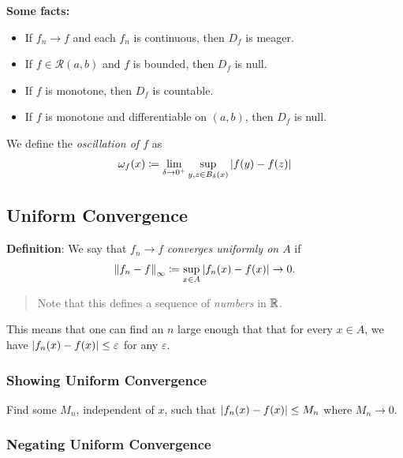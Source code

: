\textbf{Some facts:}

\begin{itemize}
\item
  If \(f_n \to f\) and each \(f_n\) is continuous, then \(D_f\) is
  meager.
\item
  If \(f \in \mathcal{R}(a, b)\) and \(f\) is bounded, then \(D_f\) is
  null.
\item
  If \(f\) is monotone, then \(D_f\) is countable.
\item
  If \(f\) is monotone and differentiable on \((a,b)\), then \(D_f\) is
  null.
\end{itemize}

We define the \emph{oscillation of \(f\)} as
\begin{align*}
\omega_f(x) \coloneqq \lim_{\delta \to 0^+} \sup_{y,z \in B_\delta(x)} {\left\lvert {f(y) - f(z)} \right\rvert}
\end{align*}

\hypertarget{uniform-convergence}{%
\subsection{Uniform Convergence}\label{uniform-convergence}}

\textbf{Definition}: We say that \(f_n \to f\) \emph{converges uniformly
on \(A\)} if
\begin{align*}
{\left\lVert {f_n - f} \right\rVert}_\infty \coloneqq \sup_{x\in A}{\left\lvert {f_n(x) - f(x)} \right\rvert} \to 0
.\end{align*}

\begin{quote}
Note that this defines a sequence of \emph{numbers} in \({\mathbb{R}}\).
\end{quote}

This means that one can find an \(n\) large enough that that for every
\(x\in A\), we have \({\left\lvert {f_n(x) - f(x)} \right\rvert} \leq \varepsilon\) for any
\(\varepsilon\).

\hypertarget{showing-uniform-convergence}{%
\subsubsection{Showing Uniform
Convergence}\label{showing-uniform-convergence}}

Find some \(M_n\), independent of \(x\), such that
\({\left\lvert {f_n(x) - f(x)} \right\rvert} \leq M_n\) where \(M_n \to 0\).

\hypertarget{negating-uniform-convergence}{%
\subsubsection{Negating Uniform
Convergence}\label{negating-uniform-convergence}}

